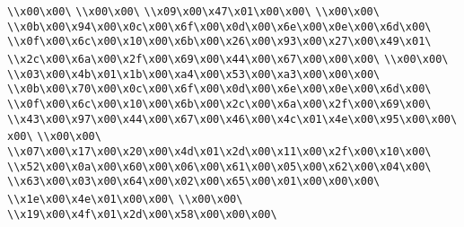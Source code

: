 \verb|\\x00\x00\|\newline
\verb|\\x00\x00\|\newline
\verb|\\x09\x00\x47\x01\x00\x00\|\newline
\verb|\\x00\x00\|\newline
\verb|\\x0b\x00\x94\x00\x0c\x00\x6f\x00\x0d\x00\x6e\x00\x0e\x00\x6d\x00\|\newline
\verb|\\x0f\x00\x6c\x00\x10\x00\x6b\x00\x26\x00\x93\x00\x27\x00\x49\x01\|\newline
\verb|\\x2c\x00\x6a\x00\x2f\x00\x69\x00\x44\x00\x67\x00\x00\x00\|\newline
\verb|\\x00\x00\|\newline
\verb|\\x03\x00\x4b\x01\x1b\x00\xa4\x00\x53\x00\xa3\x00\x00\x00\|\newline
\verb|\\x0b\x00\x70\x00\x0c\x00\x6f\x00\x0d\x00\x6e\x00\x0e\x00\x6d\x00\|\newline
\verb|\\x0f\x00\x6c\x00\x10\x00\x6b\x00\x2c\x00\x6a\x00\x2f\x00\x69\x00\|\newline
\verb|\\x43\x00\x97\x00\x44\x00\x67\x00\x46\x00\x4c\x01\x4e\x00\x95\x00\x00\x00\|\newline
\verb|\\x00\x00\|\newline
\verb|\\x07\x00\x17\x00\x20\x00\x4d\x01\x2d\x00\x11\x00\x2f\x00\x10\x00\|\newline
\verb|\\x52\x00\x0a\x00\x60\x00\x06\x00\x61\x00\x05\x00\x62\x00\x04\x00\|\newline
\verb|\\x63\x00\x03\x00\x64\x00\x02\x00\x65\x00\x01\x00\x00\x00\|\newline
\verb|\\x1e\x00\x4e\x01\x00\x00\|\newline
\verb|\\x00\x00\|\newline
\verb|\\x19\x00\x4f\x01\x2d\x00\x58\x00\x00\x00\|\newline
